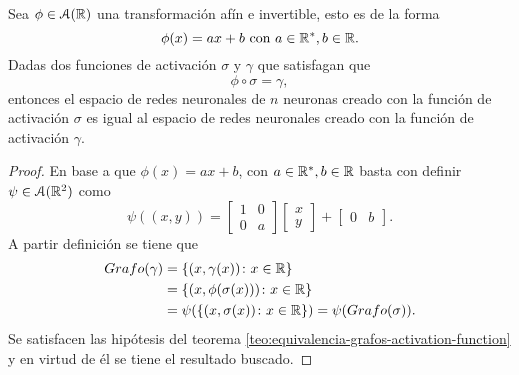 \begin{corolario}\label{corolario:afine-activation-function}
    Sea $\phi \in \mathcal{A}(\mathbb{R})$ una transformación afín e invertible, esto es de la forma 
    \begin{equation}
        \phi(x) = a x + b 
        \text{ con } a \in \mathbb{R}^*, b \in \mathbb{R}.
    \end{equation}
    Dadas dos funciones de activación $\sigma$ y $\gamma$ que satisfagan que 
    \begin{equation}
        \phi \circ \sigma = \gamma,
    \end{equation} 
    entonces 
    el espacio de redes neuronales de $n$ neuronas creado con la función de activación $\sigma$ es  
    igual al espacio de redes neuronales creado con la función de activación $\gamma$. 
\end{corolario}
\begin{proof}
    En base a que $\phi(x) = a x + b$, con 
    $a \in \mathbb{R}^*, b \in \mathbb{R}$
    basta con definir 
     $\psi  \in \mathcal{A}(\mathbb{R}^2)$ como 
    \begin{equation}
        \psi((x,y)) =  
        \begin{bmatrix}
            1 & 0 \\
             0& a
        \end{bmatrix}
        \begin{bmatrix}
            x \\
            y
        \end{bmatrix}
        +
        \begin{bmatrix}
            0 & b
        \end{bmatrix}.
    \end{equation}
    A partir  definición se tiene que 
    \begin{align}
        Grafo(\gamma) &=
        \{ (x, \gamma(x)) \colon x \in \mathbb{R}\} 
        \\
        & = 
        \{ (x, \phi(\sigma(x))) \colon x \in \mathbb{R}\}
        \\
        & =
        \psi(\{ (x, \sigma(x)) \colon x \in \mathbb{R}\})
        = 
        \psi(Grafo(\sigma)).
    \end{align}
    Se satisfacen 
    las hipótesis del teorema \ref{teo:equivalencia-grafos-activation-function} y en virtud de él se tiene el resultado buscado.
\end{proof}

